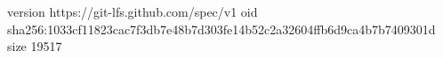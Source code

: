 version https://git-lfs.github.com/spec/v1
oid sha256:1033cf11823cac7f3db7e48b7d303fe14b52c2a32604ffb6d9ca4b7b7409301d
size 19517
